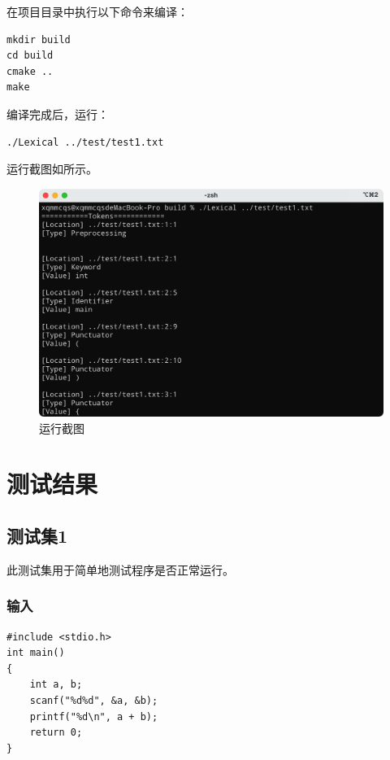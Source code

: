 \documentclass[lang=cn,11pt,a4paper,cite=authornum]{paper}
\begin{document}
在项目目录中执行以下命令来编译：

\begin{code}
\begin{verbatim}
mkdir build
cd build
cmake ..
make
\end{verbatim}
\end{code}

编译完成后，运行：

\begin{code}
\begin{verbatim}
./Lexical ../test/test1.txt
\end{verbatim}
\end{code}

运行截图如所示。

\begin{figure}[htbp]

    \centering
    \includegraphics[width=0.7\linewidth]{./Images/running.png}
    \caption{运行截图\label{fig:running}}

\end{figure}

\section{测试结果}

\subsection{测试集1}

此测试集用于简单地测试程序是否正常运行。

\subsubsection{输入}

\begin{code}
\begin{verbatim}
#include <stdio.h>
int main()
{
    int a, b;
    scanf("%d%d", &a, &b);
    printf("%d\n", a + b);
    return 0;
}
\end{verbatim}
\end{code}
\end{document}
